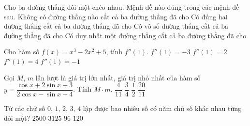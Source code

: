 \begin{ex}%
Cho ba đường thẳng đôi một chéo nhau. Mệnh đề nào đúng trong các mệnh đề sau.
	\choice
	{Không có đường thẳng nào cắt cả ba đường thẳng đã cho}
	{Có đúng hai đường thẳng cắt cả ba đường thẳng đã cho}
	{\True Có vô số đường thẳng cắt cả ba đường thẳng đã cho}
	{Có duy nhất một đường thẳng cắt cả ba đường thẳng đã cho}
	\loigiai{ }
\end{ex}

\begin{ex}%
	Cho hàm số $f(x)=x^3-2x^2+5$, tính $f''(1)$.
	\choice
	{$f''(1)=-3$}
	{\True $f''(1)=2$}
	{$f''(1)=4$}
	{$f''(1)=-1$}
\end{ex}

\begin{ex}%
	Gọi $M$, $m$ lần lượt là giá trị lớn nhất, giá trị nhỏ nhất của hàm số $y=\dfrac{\cos x+2\sin x+3}{2\cos x-\sin x+4}$. Tính $M\cdot m$.
	\choice
	{\True $\dfrac{4}{11}$}
	{$\dfrac{3}{4}$}
	{$\dfrac{1}{2}$}
	{$\dfrac{20}{11}$}
\end{ex}

\begin{ex}%
	Từ các chữ số $0$, $1$, $2$, $3$, $4$ lập được bao nhiêu số có năm chữ số khác nhau từng đôi một?
	\choice
	{$2500$}
	{$3125$}
	{\True $96$}
	{$120$}
\end{ex}

